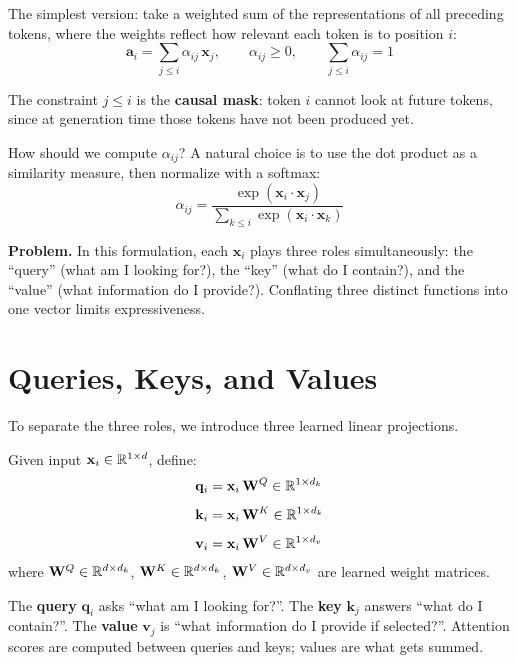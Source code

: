 \documentclass[main.tex]{subfiles}
\begin{document}
The simplest version: take a weighted sum of the representations of all preceding tokens, where the weights reflect how relevant each token is to position $i$:
$$\mathbf{a}_i = \sum_{j \leq i} \alpha_{ij} \, \mathbf{x}_j, \qquad \alpha_{ij} \geq 0, \qquad \sum_{j \leq i} \alpha_{ij} = 1$$

The constraint $j \leq i$ is the \textbf{causal mask}: token $i$ cannot look at future tokens, since at generation time those tokens have not been produced yet.

How should we compute $\alpha_{ij}$? A natural choice is to use the dot product as a similarity measure, then normalize with a softmax:
$$\alpha_{ij} = \frac{\exp(\mathbf{x}_i \cdot \mathbf{x}_j)}{\sum_{k \leq i} \exp(\mathbf{x}_i \cdot \mathbf{x}_k)}$$

\textbf{Problem.} In this formulation, each $\mathbf{x}_i$ plays three roles simultaneously: the ``query'' (what am I looking for?), the ``key'' (what do I contain?), and the ``value'' (what information do I provide?). Conflating three distinct functions into one vector limits expressiveness.

\needspace{0.33\textheight}
\section{Queries, Keys, and Values}

To separate the three roles, we introduce three learned linear projections.

\begin{definition}
Given input $\mathbf{x}_i \in \mathbb{R}^{1 \times d}$, define:
\begin{align}
\mathbf{q}_i &= \mathbf{x}_i \, \mathbf{W}^Q \in \mathbb{R}^{1 \times d_k} \\[4pt]
\mathbf{k}_i &= \mathbf{x}_i \, \mathbf{W}^K \in \mathbb{R}^{1 \times d_k} \\[4pt]
\mathbf{v}_i &= \mathbf{x}_i \, \mathbf{W}^V \in \mathbb{R}^{1 \times d_v}
\end{align}
where $\mathbf{W}^Q \in \mathbb{R}^{d \times d_k}$, $\mathbf{W}^K \in \mathbb{R}^{d \times d_k}$, $\mathbf{W}^V \in \mathbb{R}^{d \times d_v}$ are learned weight matrices.
\end{definition}

The \textbf{query} $\mathbf{q}_i$ asks ``what am I looking for?''. The \textbf{key} $\mathbf{k}_j$ answers ``what do I contain?''. The \textbf{value} $\mathbf{v}_j$ is ``what information do I provide if selected?''. Attention scores are computed between queries and keys; values are what gets summed.
\end{document}

